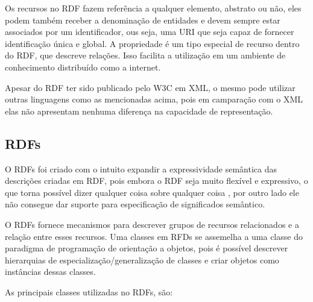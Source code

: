\vskip 0.25cm

Os recursos no RDF fazem referência a qualquer elemento, abstrato ou não, eles 
podem também receber a denominação de entidades e devem sempre estar associados 
por um identificador, ous seja, uma URI que seja capaz de fornecer identificação 
única e global. A propriedade é um tipo especial de recurso dentro do RDF, que 
descreve relações. Isso facilita a utilização em um ambiente de conhecimento 
distribuído como a internet.

Apesar do RDF ter sido publicado pelo W3C em XML, o mesmo pode utilizar outras 
linguagens como as mencionadas acima, pois em camparação com o XML elas não 
apresentam nenhuma diferença na capacidade de representação.

\subsection{RDFs}
\label{sec:rdfs}

O RDFs foi criado com o intuito expandir a expressividade semântica das 
descrições criadas em RDF, pois embora o RDF seja muito flexível e expressivo, 
o que torna possível dizer qualquer coisa sobre qualquer coisa 
\cite{hebeler2011semantic}, por outro lado ele não consegue dar suporte para 
especificação de significados semântico.

O RDFs fornece mecanismos para descrever grupos de recursos relacionados e a 
relação entre esses recursos. Uma classes em RFDs se 
assemelha a uma classe do paradigma de programação de orientação a objetos, pois
é possível descrever hierarquias de especialização/generalização de classes e
criar objetos como instâncias dessas classes.

As principais classes utilizadas no RDFs, são:

